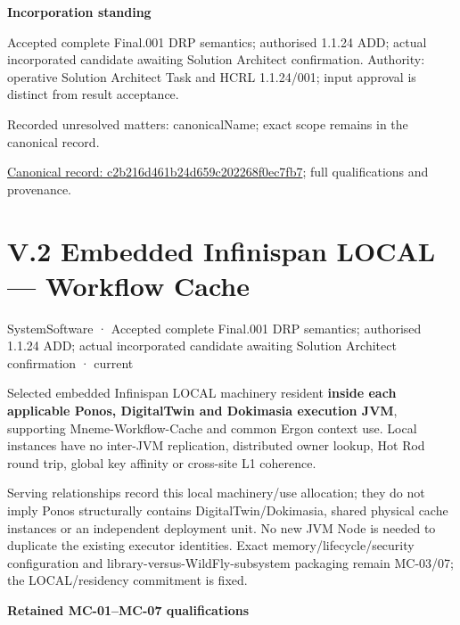 \par\medskip\textbf{Incorporation standing}\par


Accepted complete Final.001 DRP semantics; authorised 1.1.24 ADD; actual incorporated candidate awaiting Solution Architect confirmation. Authority: operative Solution Architect Task and HCRL 1.1.24/001; input approval is distinct from result acceptance.


{\small Recorded unresolved matters: canonicalName; exact scope remains in the canonical record.}\par
{\footnotesize \href{../../../../continuum/technology/system-software/c2b216d461b24d659c202268f0ec7fb7.md}{Canonical record: c2b216d461b24d659c202268f0ec7fb7}; full qualifications and provenance.}\par
\chapter*{V.2 Embedded Infinispan LOCAL — Workflow Cache}
\label{navigation:V.2}

\label{element:4048a6c775c542b6a29610d9e248a4d8}
{\small SystemSoftware · Accepted complete Final.001 DRP semantics; authorised 1.1.24 ADD; actual incorporated candidate awaiting Solution Architect confirmation · current}\par

Selected embedded Infinispan LOCAL machinery resident \textbf{inside each applicable Ponos, DigitalTwin and Dokimasia execution JVM}, supporting Mneme-Workflow-Cache and common Ergon context use. Local instances have no inter-JVM replication, distributed owner lookup, Hot Rod round trip, global key affinity or cross-site L1 coherence.



Serving relationships record this local machinery/use allocation; they do not imply Ponos structurally contains DigitalTwin/Dokimasia, shared physical cache instances or an independent deployment unit. No new JVM Node is needed to duplicate the existing executor identities. Exact memory/lifecycle/security configuration and library-versus-WildFly-subsystem packaging remain MC-03/07; the LOCAL/residency commitment is fixed.



\par\medskip\textbf{Retained MC-01–MC-07 qualifications}\par


